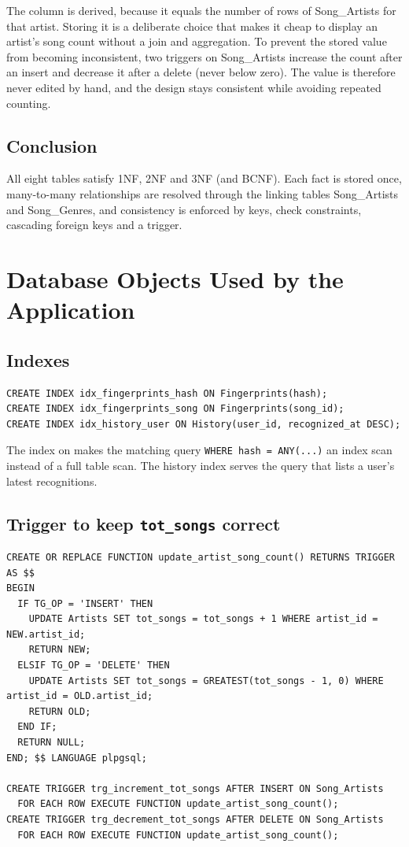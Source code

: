 \documentclass[11pt,a4paper]{article}
\newcommand{\cl}[1]{\texttt{\detokenize{#1}}}
\begin{document}
The column \cl{Artists.tot_songs} is derived, because it equals the number of rows of Song\_Artists for that artist. Storing it is a deliberate choice that makes it cheap to display an artist's song count without a join and aggregation. To prevent the stored value from becoming inconsistent, two triggers on Song\_Artists increase the count after an insert and decrease it after a delete (never below zero). The value is therefore never edited by hand, and the design stays consistent while avoiding repeated counting.

\subsection{Conclusion}

All eight tables satisfy 1NF, 2NF and 3NF (and BCNF). Each fact is stored once, many-to-many relationships are resolved through the linking tables Song\_Artists and Song\_Genres, and consistency is enforced by keys, check constraints, cascading foreign keys and a trigger.

\appendix
\section{Database Objects Used by the Application}

\subsection{Indexes}
\begin{lstlisting}
CREATE INDEX idx_fingerprints_hash ON Fingerprints(hash);
CREATE INDEX idx_fingerprints_song ON Fingerprints(song_id);
CREATE INDEX idx_history_user ON History(user_id, recognized_at DESC);
\end{lstlisting}
The index on \cl{hash} makes the matching query \texttt{WHERE hash = ANY(...)} an index scan instead of a full table scan. The history index serves the query that lists a user's latest recognitions.

\subsection{Trigger to keep \texttt{tot\_songs} correct}
\begin{lstlisting}
CREATE OR REPLACE FUNCTION update_artist_song_count() RETURNS TRIGGER AS $$
BEGIN
  IF TG_OP = 'INSERT' THEN
    UPDATE Artists SET tot_songs = tot_songs + 1 WHERE artist_id = NEW.artist_id;
    RETURN NEW;
  ELSIF TG_OP = 'DELETE' THEN
    UPDATE Artists SET tot_songs = GREATEST(tot_songs - 1, 0) WHERE artist_id = OLD.artist_id;
    RETURN OLD;
  END IF;
  RETURN NULL;
END; $$ LANGUAGE plpgsql;

CREATE TRIGGER trg_increment_tot_songs AFTER INSERT ON Song_Artists
  FOR EACH ROW EXECUTE FUNCTION update_artist_song_count();
CREATE TRIGGER trg_decrement_tot_songs AFTER DELETE ON Song_Artists
  FOR EACH ROW EXECUTE FUNCTION update_artist_song_count();
\end{lstlisting}
\end{document}
